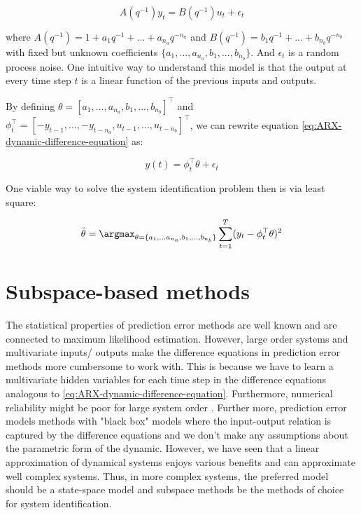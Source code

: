 \documentclass{article}[12pt]
\begin{document}
\begin{equation}
    A(q^{-1})y_t = B(q^{-1})u_t + \epsilon_t
    \label{eq:ARX-dynamic-difference-equation}
\end{equation}

where $A(q^{-1}) = 1 + a_1q^{-1} + ... + a_{n_a} q^{-n_a}$ and $B(q^{-1}) = b_1 q^{-1} +... + b_{n_b}q^{-n_b}$ with fixed but unknown coefficients $\{a_1, ..., a_{n_a}, b_1, ..., b_{n_b}\}$. And $\epsilon_t$ is a random process noise. One intuitive way to understand this model is that the output at every time step $t$ is a linear function of the previous inputs and outputs.

By defining $\theta = [a_1,...,a_{n_a},b_1,...,b_{n_b}]^\top$ and $\phi_t^\top = [-y_{t-1},...,-y_{t-n_a},u_{t-1},...,u_{t-n_b}]^\top$, we can rewrite equation \eqref{eq:ARX-dynamic-difference-equation} as:

\begin{equation}
    y(t) = \phi_t^\top \theta + \epsilon_t
    \label{eq:ARX-dynamic-algebraic-form}
\end{equation}

One viable way to solve the system identification problem then is via least square:

\begin{equation}
    \hat{\theta} = \argmax_{\theta = \{a_1,...a_{n_a},b_1,...,b_{n_b}\}} \sum_{t=1}^T (y_t - \phi_t^\top \theta)^2
    \label{eq:ARX-least-square-solution}
\end{equation}

\section{Subspace-based methods}
The statistical properties of prediction error methods are well known and are connected to maximum likelihood estimation. However, large order systems and multivariate inputs/ outputs make the difference equations in prediction error methods more cumbersome to work with. This is because we have to learn a multivariate hidden variables for each time step in the difference equations analogous to \eqref{eq:ARX-dynamic-difference-equation}. Furthermore, numerical reliability might be poor for large system order \cite{Viberg:1995:SMI:222618.222630}. Further more, prediction error models methods with "black box" models where the input-output relation is captured by the difference equations and we don't make any assumptions about the parametric form of the dynamic. However, we have seen that a linear approximation of dynamical systems enjoys various benefits and can approximate well complex systems. Thus, in more complex systems, the preferred model should be a state-space model and subspace methods be the methods of choice for system identification.
\end{document}

